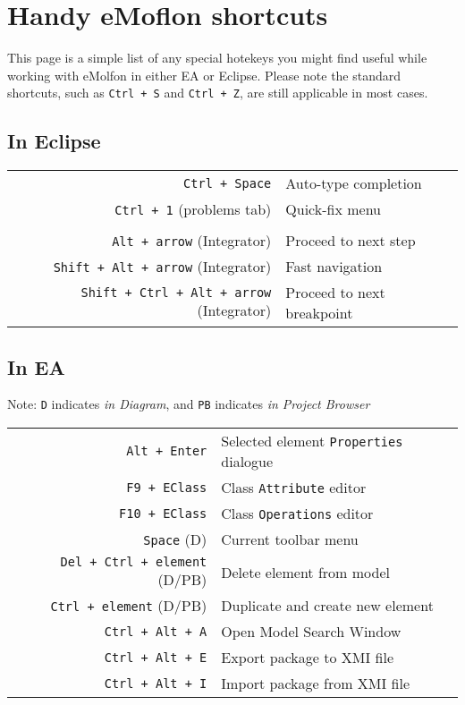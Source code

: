 \newpage
\section{Handy eMoflon shortcuts}
\genHeader

This page is a simple list of any special hotekeys you might find useful while working with eMolfon in either EA or Eclipse. Please note the standard
shortcuts, such as \texttt{Ctrl + S} and \texttt{Ctrl + Z}, are still applicable in most cases.

\vspace{1cm}

\subsection{In Eclipse}

\begin{tabular}{r|l}
\texttt{Ctrl + Space} & Auto-type completion\\
\texttt{Ctrl + 1} (problems tab) & Quick-fix menu \\
\\
\texttt{Alt + arrow} (Integrator) & Proceed to next step \\
\texttt{Shift + Alt + arrow} (Integrator) & Fast navigation \\
\texttt{Shift + Ctrl + Alt + arrow} (Integrator) & Proceed to next breakpoint \\
%
\end{tabular}

\vspace{1cm}

\subsection{In EA}

{\small Note: \texttt{D} indicates \emph{in Diagram}, and \texttt{PB} indicates \emph{in Project Browser}}

\begin{tabular}{r|l}
\texttt{Alt + Enter} & Selected element \texttt{Properties} dialogue \\
\texttt{F9 + EClass} & Class \texttt{Attribute} editor \\
\texttt{F10 + EClass} & Class \texttt{Operations} editor \\
\texttt{Space} (D) & Current toolbar menu \\
\texttt{Del + Ctrl + element} (D/PB) & Delete element from model\\
\texttt{Ctrl + element} (D/PB) & Duplicate and create new element \\
\texttt{Ctrl + Alt + A} & Open Model Search Window \\
\texttt{Ctrl + Alt + E} & Export package to XMI file \\
\texttt{Ctrl + Alt + I} & Import package from XMI file \\
%
\end{tabular}

